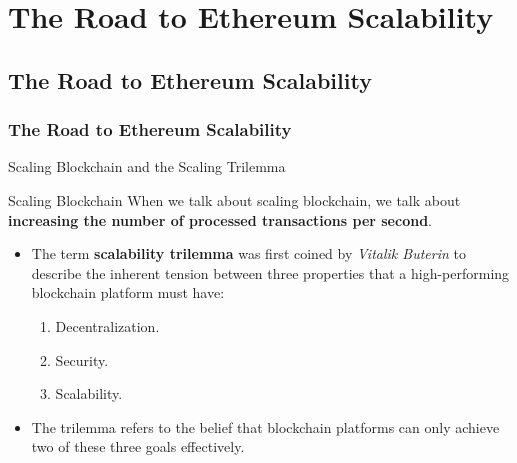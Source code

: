 

\renewcommand{\mytitle}{The Road to Ethereum Scalability}
\ifZEROSEC \fi
\ifSEC \section{\mytitle{}}\fi
\ifSUBSEC \subsection{\mytitle{}}\fi
\ifSUBSUBSEC \subsubsection{\mytitle{}}\fi


\begin{frame} {Scaling Blockchain and the Scaling Trilemma}
\begin{block}{Scaling Blockchain}
When we talk about scaling blockchain, we talk about \textbf{increasing the number of processed transactions per second}.
\end{block}
\begin{itemize}
\item The term \textbf{scalability trilemma} was first coined by \textit{Vitalik Buterin} to describe the inherent tension between three properties that a high-performing blockchain platform must have:
  \begin{enumerate}
  \item Decentralization.
  \item Security.
  \item Scalability.
  \end{enumerate}
\item The trilemma refers to the belief that blockchain platforms can only achieve two of these three goals effectively.
\end{itemize}
\end{frame}




